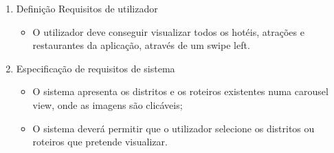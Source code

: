 \begin{enumerate}
    \item Definição Requisitos de utilizador
    \begin{itemize}
        \item O utilizador deve conseguir visualizar todos os hotéis, atrações e restaurantes da aplicação, através de um swipe left.
    \end{itemize}
    \item Especificação de requisitos de sistema
    \begin{itemize}
        \item O sistema apresenta os distritos e os roteiros existentes numa carousel view, onde as imagens são clicáveis;
        \item O sistema deverá permitir que o utilizador selecione os distritos ou roteiros que pretende visualizar.
    \end{itemize}
\end{enumerate}